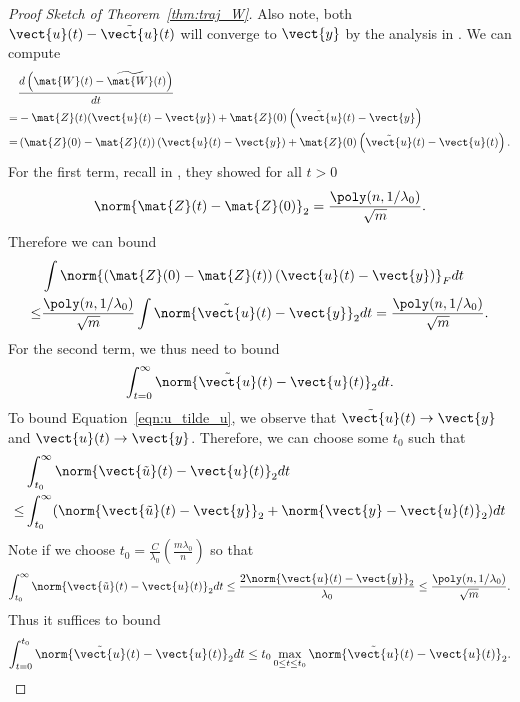 \begin{proof}[Proof Sketch of Theorem~\ref{thm:traj_W}]
	Also note, both $\vect{u}(t)-\tilde{\vect{u}}(t)$ will converge to $\vect{y}$ by the analysis in \cite{du2018provably}.
	We can compute \begin{align*}
	&\frac{d \left(\mat{W}(t)-\widetilde{\mat{W}}(t)\right)}{dt}\\
	= &-\mat{Z}(t)(\vect{u}(t)-\vect{y}) + \mat{Z}(0)\left(\tilde{\vect{u}}(t)-\vect{y}\right) \\
	= &\left(\mat{Z}(0)-\mat{Z}(t)\right)\left(\vect{u}(t)-\vect{y}\right) + \mat{Z}(0)\left(\tilde{\vect{u}}(t)-\vect{u}(t)\right).
	\end{align*}
	For the first term, recall in \cite{du2018provably}, they showed for all $t >0$ \begin{align*}
	\norm{\mat{Z}(t) - \mat{Z}(0)}_2 = \frac{\poly(n,1/\lambda_0)}{\sqrt{m}}.
	\end{align*}
	Therefore we can bound \begin{align*}
	&\int \norm{\left(\mat{Z}(0)-\mat{Z}(t)\right)\left(\vect{u}(t)-\vect{y}\right) }_F dt\\
	\le &\frac{\poly(n,1/\lambda_0)}{\sqrt{m}} \int \norm{\tilde{\vect{u}}(t)-\vect{y}}_2 dt= \frac{\poly(n,1/\lambda_0)}{\sqrt{m}}.
	\end{align*}
	For the second term, we thus need to bound\begin{align}
	\int_{t=0}^{\infty}\norm{\tilde{\vect{u}}(t)-\vect{u}(t)}_2 dt. \label{eqn:u_tilde_u}
	\end{align}
	To bound Equation~\eqref{eqn:u_tilde_u}, we observe that $\tilde{\vect{u}}(t) \rightarrow \vect{y}$ and $\vect{u}(t) \rightarrow \vect{y}$.
	Therefore, we can choose some $t_0$ such that \begin{align*}
	&\int_{t_0}^\infty\norm{\vect{\tilde{u}}(t)-\vect{u}(t)}_2 dt\\
	\le &\int_{t_0}^\infty(\norm{\vect{\tilde{u}}(t)-\vect{y}}_2  + \norm{\vect{y}-\vect{u}(t)}_2 )dt
	\end{align*}
	Note if we choose $t_0 = \frac{C}{\lambda_0}\left(\frac{m\lambda_0}{n}\right)$ so that \begin{align*}
	\int_{t_0}^\infty\norm{\vect{\tilde{u}}(t)-\vect{u}(t)}_2 dt \le \frac{2\norm{\vect{u}(t)-\vect{y}}_2}{\lambda_0} \le \frac{\poly(n,1/\lambda_0)}{\sqrt{m}}.
	\end{align*}
	Thus it suffices to bound \begin{align*}
	\int_{t=0}^{t_0}\norm{\tilde{\vect{u}}(t)-\vect{u}(t)}_2 dt \le t_0 \max_{0\le t\le t_0} \norm{\tilde{\vect{u}}(t)-\vect{u}(t)}_2.
	\end{align*}

\end{proof}
